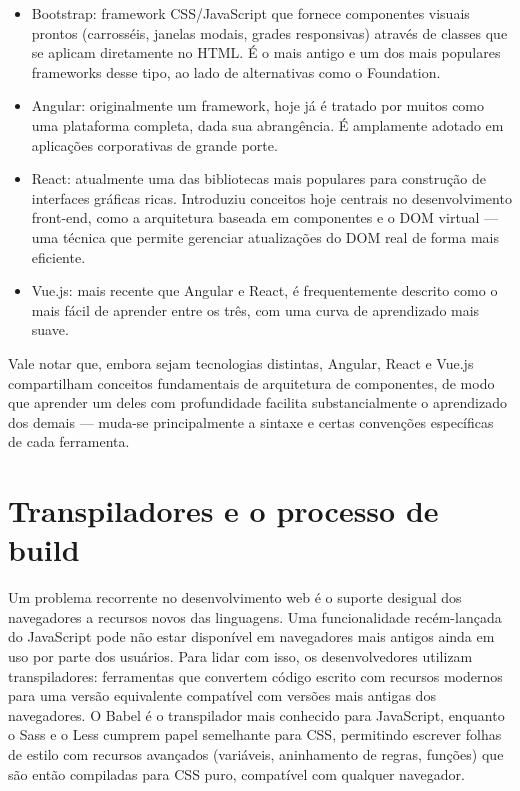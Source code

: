\begin{itemize}
  \item Bootstrap: framework CSS/JavaScript que fornece componentes visuais prontos (carrosséis, janelas modais, grades responsivas) através de classes que se aplicam diretamente no HTML. É o mais antigo e um dos mais populares frameworks desse tipo, ao lado de alternativas como o Foundation.
\end{itemize}

\begin{itemize}
  \item Angular: originalmente um framework, hoje já é tratado por muitos como uma plataforma completa, dada sua abrangência. É amplamente adotado em aplicações corporativas de grande porte.
\end{itemize}

\begin{itemize}
  \item React: atualmente uma das bibliotecas mais populares para construção de interfaces gráficas ricas. Introduziu conceitos hoje centrais no desenvolvimento front-end, como a arquitetura baseada em componentes e o DOM virtual — uma técnica que permite gerenciar atualizações do DOM real de forma mais eficiente.
\end{itemize}

\begin{itemize}
  \item Vue.js: mais recente que Angular e React, é frequentemente descrito como o mais fácil de aprender entre os três, com uma curva de aprendizado mais suave.
\end{itemize}

Vale notar que, embora sejam tecnologias distintas, Angular, React e Vue.js compartilham conceitos fundamentais de arquitetura de componentes, de modo que aprender um deles com profundidade facilita substancialmente o aprendizado dos demais — muda-se principalmente a sintaxe e certas convenções específicas de cada ferramenta.

\section{Transpiladores e o processo de build}

Um problema recorrente no desenvolvimento web é o suporte desigual dos navegadores a recursos novos das linguagens. Uma funcionalidade recém-lançada do JavaScript pode não estar disponível em navegadores mais antigos ainda em uso por parte dos usuários. Para lidar com isso, os desenvolvedores utilizam transpiladores: ferramentas que convertem código escrito com recursos modernos para uma versão equivalente compatível com versões mais antigas dos navegadores. O Babel é o transpilador mais conhecido para JavaScript, enquanto o Sass e o Less cumprem papel semelhante para CSS, permitindo escrever folhas de estilo com recursos avançados (variáveis, aninhamento de regras, funções) que são então compiladas para CSS puro, compatível com qualquer navegador.

